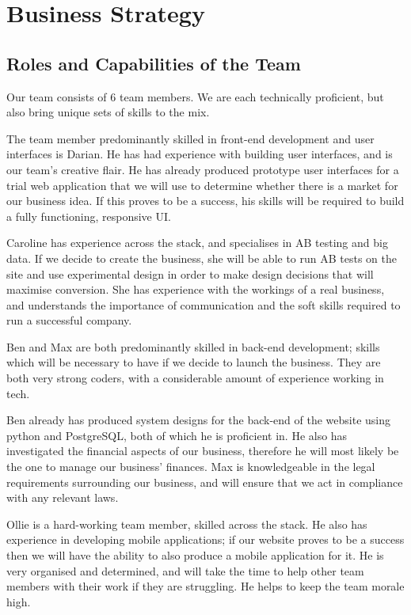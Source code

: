 \documentclass[11pt, a4paper]{article}
\begin{document}
\setlength{\parskip}{6pt}
\setlength{\parindent}{0pt}

\section{Business Strategy}

\subsection{Roles and Capabilities of the Team}

Our team consists of 6 team members. We are each technically proficient, but also bring unique sets of skills to the mix.

The team member predominantly skilled in front-end development and user interfaces is Darian. He has had experience with building user interfaces, and is our team’s creative flair. He has already produced prototype user interfaces for a trial web application that we will use to determine whether there is a market for our business idea. If this proves to be a success, his skills will be required to build a fully functioning, responsive UI.

Caroline has experience across the stack, and specialises in AB testing and big data. If we decide to create the business, she will be able to run AB tests on the site and use experimental design in order to make design decisions that will maximise conversion. She has experience with the workings of a real business, and understands the importance of communication and the soft skills required to run a successful company.

Ben and Max are both predominantly skilled in back-end development; skills which will be necessary to have if we decide to launch the business. They are both very strong coders, with a considerable amount of experience working in tech.

Ben already has produced system designs for the back-end of the website using python and PostgreSQL, both of which he is proficient in. He also has investigated the financial aspects of our business, therefore he will most likely be the one to manage our business’ finances. Max is knowledgeable in the legal requirements surrounding our business, and will ensure that we act in compliance with any relevant laws.

Ollie is a hard-working team member, skilled across the stack. He also has experience in developing mobile applications; if our website proves to be a success then we will have the ability to also produce a mobile application for it. He is very organised and determined, and will take the time to help other team members with their work if they are struggling. He helps to keep the team morale high.
\end{document}
